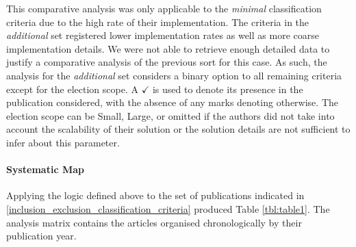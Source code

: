 \documentclass[../access.tex]{subfiles}
\begin{document}
    This comparative analysis was only applicable to the \textit{minimal} classification criteria due to the high rate of their implementation. The criteria in the \textit{additional} set registered lower implementation rates as well as more coarse implementation details. We were not able to retrieve enough detailed data to justify a comparative analysis of the previous sort for this case. As such, the analysis for the \textit{additional} set considers a binary option to all remaining criteria except for the election scope. A $ \checkmark $ is used to denote its presence in the publication considered, with the absence of any marks denoting otherwise. The election scope can be \textit\footnotesize{Small}, \textit\footnotesize{Large}, or omitted if the authors did not take into account the scalability of their solution or the solution details are not sufficient to infer about this parameter.
    
    \paragraph{Systematic Map}
    Applying the logic defined above to the set of publications indicated in \ref{inclusion_exclusion_classification_criteria} produced Table \ref{tbl:table1}. The analysis matrix contains the articles organised chronologically by their publication year.
    
\end{document}
